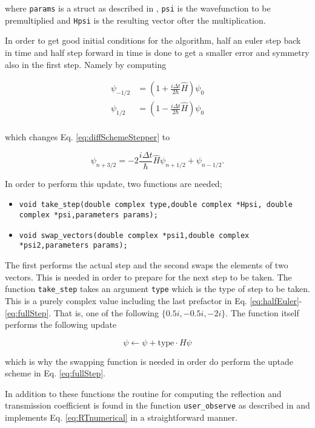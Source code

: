 where \verb|params| is a struct as described in \cite{wavepacket}, \verb|psi| is the wavefunction to be premultiplied and \verb|Hpsi| is the resulting vector ofter the multiplication.

In order to get good initial conditions for the algorithm, half an euler step back in time and half step forward in time is done to get a smaller error and symmetry also in the first step. Namely by computing

\begin{equation}
\label{eq:halfEuler}
  \begin{split}
    \psi_{-1/2} &= \left( 1 + \frac{i\Delta t}{2\hbar}\hat H\right)\psi_0 \\
    \psi_{1/2} &= \left( 1 - \frac{i\Delta t}{2\hbar}\hat H\right)\psi_0 \\
  \end{split}
\end{equation}

which changes Eq. \eqref{eq:diffSchemeStepper} to

\begin{equation}
\label{eq:fullStep}
  \psi_{n+3/2} = -2\frac{i\Delta t}{\hbar}\hat H \psi_{n+1/2} + \psi_{n-1/2}.
\end{equation}

In order to perform this update, two functions are needed;

\begin{itemize}
  \item \verb|void take_step(double complex type,double complex *Hpsi,|\newline\verb| double complex *psi,parameters params);|
  \item \verb|void swap_vectors(double complex *psi1,double complex|\newline\verb| *psi2,parameters params);|
\end{itemize}

The first performs the actual step and the second swaps the elements of two vectors. This is needed in order to prepare for the next step to be taken. The function \verb|take_step| takes an argument \verb|type| which is the type of step to be taken. This is a purely complex value including the last prefactor in Eq. \eqref{eq:halfEuler}-\eqref{eq:fullStep}. That is, one of the following $\{0.5i,-0.5i,-2i\}$. The function itself performs the following update

\begin{equation*}
  \psi \leftarrow \psi + \text{type}\cdot H\psi
\end{equation*}

which is why the swapping function is needed in order do perform the uptade scheme in Eq. \eqref{eq:fullStep}.

In addition to these functions the routine for computing the reflection and transmission coefficient is found in the function \verb|user_observe| as described in \cite{wavepacket} and implements Eq. \eqref{eq:RTnumerical} in a straightforward manner.
